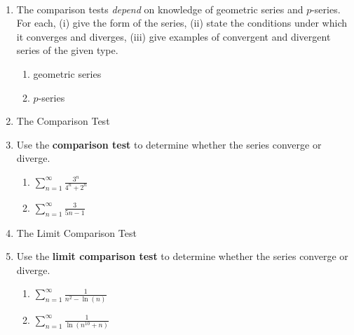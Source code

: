 \documentclass[11pt,fleqn]{article}
\begin{document}
\renewcommand{\headrulewidth}{0pt}
\newcommand{\blank}[1]{\rule{#1}{0.75pt}}
\newcommand{\bc}{\begin{center}}
\newcommand{\ec}{\end{center}}


\vspace*{-0.7in}

\begin{center}
  \large
  \\
   
\end{center}
\begin{enumerate}
\item The comparison tests \emph{depend} on knowledge of geometric series and $p$-series. For each, (i) give the form of the series, (ii) state the conditions under which it converges and diverges, (iii) give examples of convergent and divergent series of the given type.
	\begin{enumerate}
	\item geometric series
	\vfill
	\item $p$-series
	\vfill
	\end{enumerate}
\item The Comparison Test
\vfill
\item Use the \textbf{comparison test} to determine whether the series converge or diverge.
	\begin{enumerate}
	\item $\displaystyle \sum_{n=1}^\infty \frac{3^n}{4^n+2^n} $
	\vfill
	\newpage
	\item $\displaystyle \sum_{n=1}^\infty \frac{3}{5n-1}$
	\vfill 
	\end{enumerate}
\item The Limit Comparison Test
\vfill
\item Use the \textbf{limit comparison test} to determine whether the series converge or diverge.
	\begin{enumerate}
	\item $\displaystyle \sum_{n=1}^\infty \frac{1}{n^2-\ln(n)}$
	\vfill
	\item $\displaystyle \sum_{n=1}^\infty \frac{1}{\ln(n^{10}+n)}$
	\vfill 
	\end{enumerate}
\end{enumerate}
\end{document}
